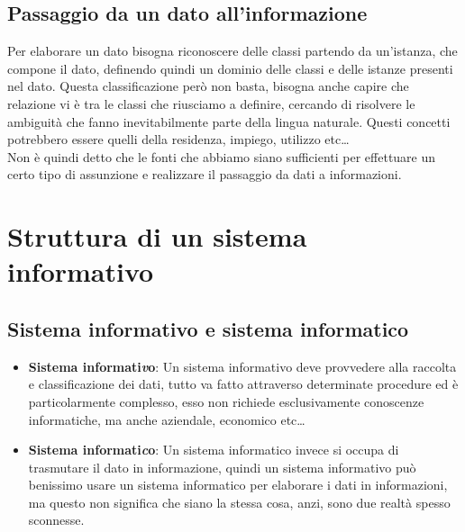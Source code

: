 \documentclass[a4paper,12pt]{report}
\begin{document}
\subsection{Passaggio da un dato all'informazione}\label{ss:datoainformazione}
Per elaborare un dato bisogna riconoscere delle classi partendo da un'istanza, che compone il dato, definendo quindi un dominio delle classi e delle istanze presenti nel dato.
Questa classificazione però non basta, bisogna anche capire che relazione vi è tra le classi che riusciamo a definire, cercando di risolvere le ambiguità che fanno inevitabilmente parte della lingua naturale. Questi concetti potrebbero essere quelli della residenza, impiego, utilizzo etc\dots\\Non è quindi detto che le fonti che abbiamo siano sufficienti per effettuare un certo tipo di assunzione e realizzare il passaggio da dati a informazioni.

\section{Struttura di un sistema informativo}
\subsection{Sistema informativo e sistema informatico}
\begin{itemize}
	\item \textbf{Sistema informati\textit{v}o}: Un sistema informativo deve provvedere alla raccolta e  classificazione dei dati, tutto va fatto attraverso determinate procedure ed è particolarmente complesso, esso non richiede esclusivamente conoscenze informatiche, ma anche aziendale, economico etc\dots
	\item \textbf{Sistema informati\textit{c}o}: Un sistema informatico invece si occupa di trasmutare il dato in informazione, quindi un sistema informativo può benissimo usare un sistema informatico per elaborare i dati in informazioni, ma questo non significa che siano la stessa cosa, anzi, sono due realtà spesso sconnesse.
\end{itemize}
\end{document}
